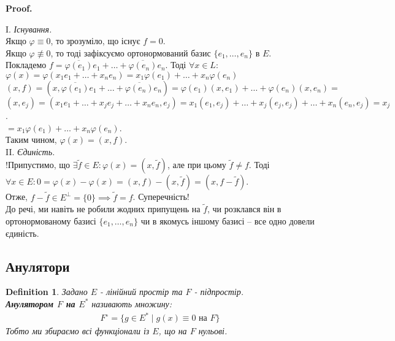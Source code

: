\documentclass[a4paper, 10pt]{article}
\makeatletter
\theoremstyle{theoremdd}
\newtheorem{definition}[theorem]{Definition}
\renewenvironment{proof}[1][Proof.\\]{\par
\pushQED{\hfill \qed}%
\normalfont \topsep6\p@\@plus6\p@\relax
\trivlist
\item\relax
{\bfseries
#1\@addpunct{.}}\hspace\labelsep\ignorespaces
}{%
\popQED\endtrivlist\@endpefalse
}
\makeatother
\begin{document}
\begin{proof}
I. \textit{Існування.}\\
Якщо $\varphi \equiv 0$, то зрозуміло, що існує $f = 0$.\\
Якщо $\varphi \not\equiv 0$, то тоді зафіксуємо ортонормований базис $\{e_1,\dots,e_n\}$ в $E$. \\ Покладемо $f = \overline{\varphi(e_1)}e_1 + \dots + \overline{\varphi(e_n)}e_n$. Тоді $\forall x \in L:$\\
$\varphi(x) = \varphi(x_1 e_1+\dots+x_n e_n) = x_1 \varphi(e_1) + \dots + x_n \varphi(e_n)$\\
$(x,f) = (x,\overline{\varphi(e_1)}e_1 + \dots + \overline{\varphi(e_n)}e_n) = \varphi(e_1) (x,e_1) + \dots + \varphi(e_n)(x,e_n) \boxed{=}$\\
$(x,e_j) = (x_1 e_1 + \dots + x_j e_j + \dots + x_n e_n, e_j) = x_1 (e_1,e_j) + \dots + x_j (e_j,e_j) + \dots + x_n (e_n,e_j) = x_j$.\\
$\boxed{=} x_1 \varphi(e_1) + \dots + x_n \varphi(e_n)$.\\
Таким чином, $\varphi(x) = (x,f)$.
\bigskip \\
II. \textit{Єдиність.}\\
!Припустимо, що $\exists \widetilde{f} \in E: \varphi(x) = (x,\widetilde{f})$, але при цьому $\widetilde{f} \neq f$. Тоді\\
$\forall x \in E: 0 = \varphi(x) - \varphi(x) = (x,f) - (x,\widetilde{f}) = (x,f-\widetilde{f})$.\\
Отже, $f-\widetilde{f} \in E^\perp = \{0\} \implies \widetilde{f} = f$. Суперечність!\\
До речі, ми навіть не робили жодних припущень на $\widetilde{f}$, чи розклався він в ортонормованому базисі $\{e_1,\dots,e_n\}$ чи в якомусь іншому базисі -- все одно довели єдиність.
\end{proof}

\iffalse
\subsection{Анулятори}
\begin{definition}
Задано $E$ - лінійний простір та $F$ - підпростір.\\
\textbf{Анулятором $F$ на $E^*$} називають множину:
\begin{align*}
F^\circ = \{ g \in E^* \mid g(x) \equiv 0 \text{ на }F \}
\end{align*}
Тобто ми збираємо всі функціонали із $E$, що на $F$ нульові.
\end{definition}
\end{document}
